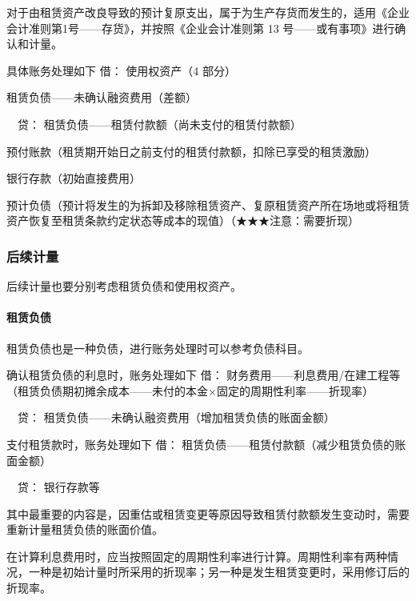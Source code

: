 \documentclass[UTF8,12pt]{ctexart}
\newenvironment{Dr}{\noindent 借：}{\par}
\newenvironment{Cr}{\noindent \ \ 贷：}{\par}
\numberwithin{equation}{section} %
\numberwithin{figure}{section}
\numberwithin{table}{section}
\begin{document}
	对于由租赁资产改良导致的预计复原支出，属于为生产存货而发生的，适用《企业会计准则第1号——存货》，并按照《企业会计准则第 13 号——或有事项》进行确认和计量。
	
	具体账务处理如下
	\begin{Dr}
		使用权资产（4 部分）
		
		租赁负债——未确认融资费用（差额）
	\end{Dr}
	\begin{Cr}
		租赁负债——租赁付款额（尚未支付的租赁付款额）
		
		预付账款（租赁期开始日之前支付的租赁付款额，扣除已享受的租赁激励） 
		
		银行存款（初始直接费用）
		
		预计负债（预计将发生的为拆卸及移除租赁资产、复原租赁资产所在场地或将租赁资产恢复至租赁条款约定状态等成本的现值）（★★★注意：需要折现）
	\end{Cr}
	
	
	
	\subsubsection{后续计量}
	后续计量也要分别考虑租赁负债和使用权资产。
	
	\paragraph{租赁负债}
	租赁负债也是一种负债，进行账务处理时可以参考负债科目。
	
	确认租赁负债的利息时，账务处理如下
	\begin{Dr}
		财务费用——利息费用/在建工程等（租赁负债期初摊余成本——未付的本金×固定的周期性利率——折现率）
	\end{Dr}
	\begin{Cr}
		租赁负债——未确认融资费用（增加租赁负债的账面金额）
	\end{Cr}

	支付租赁款时，账务处理如下
	\begin{Dr}
		租赁负债——租赁付款额（减少租赁负债的账面金额）
	\end{Dr}
	\begin{Cr}
		银行存款等
	\end{Cr}

	其中最重要的内容是，因重估或租赁变更等原因导致租赁付款额发生变动时，需要重新计量租赁负债的账面价值。
	
	在计算利息费用时，应当按照固定的周期性利率进行计算。周期性利率有两种情况，一种是初始计量时所采用的折现率；另一种是发生租赁变更时，采用修订后的折现率。
	
\end{document}
